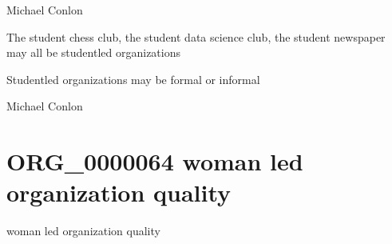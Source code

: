\documentclass[letterpaper,10pt,english]{sphinxmanual}
\begin{document}
\begin{sphinxShadowBox}

\sphinxAtStartPar
Michael Conlon 
\end{sphinxShadowBox}

\begin{sphinxShadowBox}

\sphinxAtStartPar
The student chess club, the student data science club, the student newspaper may all be student\sphinxhyphen{}led organizations
\end{sphinxShadowBox}

\begin{sphinxShadowBox}

\sphinxAtStartPar
Student\sphinxhyphen{}led organizations may be formal or informal
\end{sphinxShadowBox}

\begin{sphinxShadowBox}

\sphinxAtStartPar
{}
\end{sphinxShadowBox}

\begin{sphinxShadowBox}

\sphinxAtStartPar
Michael Conlon 
\end{sphinxShadowBox}
\begin{quote}
\label{\detokenize{doc-ORG_0000064:org-0000064}}\label{\detokenize{doc-ORG_0000064:woman-led-organization-quality}}\label{\detokenize{doc-ORG_0000064:org-0000064}}
\ignorespaces \end{quote}


\section{ORG\_0000064 \sphinxhyphen{} woman led organization quality}
\label{\detokenize{doc-ORG_0000064:org-0000064-woman-led-organization-quality}}\label{\detokenize{doc-ORG_0000064:index-0}}\label{\detokenize{doc-ORG_0000064::doc}}
\begin{sphinxShadowBox}

\sphinxAtStartPar
woman led organization quality
\end{sphinxShadowBox}
\end{document}

